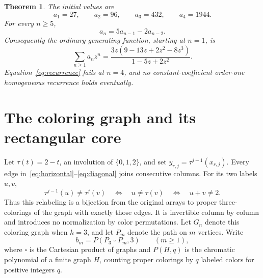 \documentclass[11pt,a4paper]{article}
\newtheorem{theorem}{Theorem}
\begin{document}
\begin{theorem}\label{thm:main}
The initial values are
\[
 a_1=27,\qquad a_2=96,\qquad a_3=432,\qquad a_4=1944.
\]
For every \(n\ge5\),
\begin{equation}\label{eq:recurrence}
 a_n=5a_{n-1}-2a_{n-2}.
\end{equation}
Consequently the ordinary generating function, starting at \(n=1\), is
\begin{equation}\label{eq:gf}
 \sum_{n\ge1}a_nz^n
 =\frac{3z(9-13z+2z^2-8z^3)}{1-5z+2z^2}.
\end{equation}
Equation~\eqref{eq:recurrence} fails at \(n=4\), and no constant-coefficient
order-one homogeneous recurrence holds eventually.
\end{theorem}

\section{The coloring graph and its rectangular core}\label{sec:boundary}
Let \(\tau(t)=2-t\), an involution of \(\{0,1,2\}\), and set
\(y_{r,j}=\tau^{j-1}(x_{r,j})\).
Every edge in~\eqref{eq:horizontal}--\eqref{eq:diagonal} joins consecutive
columns. For its two labels \(u,v\),
\[
 \tau^{j-1}(u)\ne\tau^j(v)
 \quad\Longleftrightarrow\quad u\ne\tau(v)
 \quad\Longleftrightarrow\quad u+v\ne2.
\]
Thus this relabeling is a bijection from the original arrays to proper
three-colorings of the graph with exactly those edges. It is invertible
column by column and introduces no normalization by color permutations.
Let \(G_n\) denote this coloring graph when \(h=3\), and let \(P_m\)
denote the path on \(m\) vertices. Write
\[
 b_m=P(P_3\mathbin{\square}P_m,3)\qquad(m\ge1),
\]
where \(\square\) is the Cartesian product of graphs and \(P(H,q)\)
is the chromatic polynomial of a finite graph \(H\), counting proper
colorings by \(q\) labeled colors for positive integers \(q\).
\end{document}
